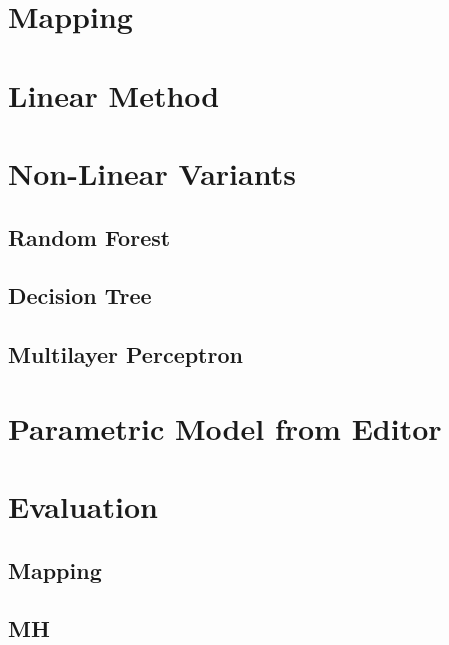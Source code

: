 \section{Mapping}

\section{Linear Method}

\section{Non-Linear Variants}
\subsection{Random Forest}

\subsection{Decision Tree}

\subsection{Multilayer Perceptron}

\section{Parametric Model from Editor}

\section{Evaluation}

\subsection{Mapping}

\subsection{MH}
